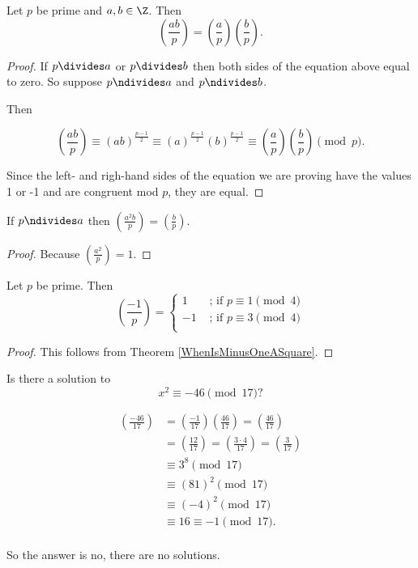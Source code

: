 \documentclass[oneside,12pt]{amsart}
\begin{document}
\begin{lemma} Let $p$ be prime and $a,b\in\Z$. Then
$$\left( \frac{ab}{p} \right)= \left( \frac{a}{p} \right)\left( \frac{b}{p} \right).$$
\end{lemma}
\begin{proof}
If $p\divides a$ or $p\divides b$ then both sides of the equation above equal to zero. So suppose
$p\ndivides a$ and $p\ndivides b$.

Then

$$\left( \frac{ab}{p} \right) \equiv (ab)^{\frac{p-1}{2}} \equiv (a)^{\frac{p-1}{2}} (b)^{\frac{p-1}{2}}  \equiv \left( \frac{a}{p} \right)\left( \frac{b}{p} \right) \pmod p.$$

Since the left- and righ-hand sides of the equation we are proving have the values 1 or -1 and are congruent mod $p$, they are equal.
\end{proof}

\begin{lemma}
If $p\ndivides a$ then $\left( \frac{a^2b}{p} \right)=\left( \frac{b}{p} \right)$.
\end{lemma}
\begin{proof}
Because $\left( \frac{a^2}{p} \right) = 1$.
\end{proof}

\begin{lemma} Let $p$ be prime. Then
$$
\left( \frac{-1}{p} \right) =
\begin{cases}
1  &\text{ ; if } p\equiv 1 \pmod 4 \\
-1    &\text{ ; if } p\equiv 3 \pmod 4 \\
\end{cases}
$$
\end{lemma}
\begin{proof}
This follows from Theorem \ref{WhenIsMinusOneASquare}.
\end{proof}

\begin{example}
Is there a solution to
$$x^2\equiv -46 \pmod {17}?$$

\begin{align*}
\left( \frac{-46}{17} \right) &= \left( \frac{-1}{17} \right) \left( \frac{46}{17} \right) = \left( \frac{46}{17} \right)\\
&=   \left( \frac{12}{17} \right) =  \left( \frac{3 \cdot 4}{17} \right) = \left( \frac{3}{17} \right) \\
&\equiv 3^8 \pmod {17} \\
&\equiv (81)^2 \pmod {17} \\
&\equiv (-4)^2 \pmod {17} \\
&\equiv 16 \equiv -1 \pmod {17}. \\
\end{align*}

So the answer is no, there are no solutions.
\end{example}
\end{document}
